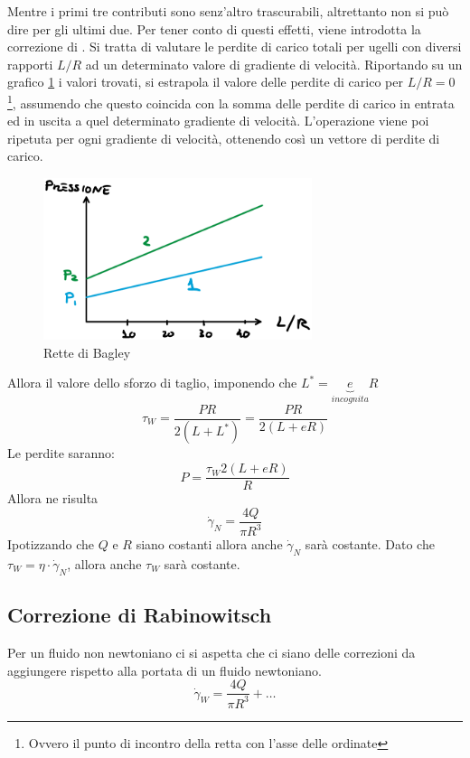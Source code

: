 Mentre i primi tre contributi sono senz'altro trascurabili, altrettanto non si può dire per gli ultimi due. Per tener conto di questi effetti, viene introdotta la correzione di .
Si tratta di valutare le perdite di carico totali per ugelli con diversi rapporti $L/R$ ad un determinato valore di gradiente di velocità.
Riportando su un grafico \ref{fig:Bagley} i valori trovati, si estrapola il valore delle perdite di carico per $L/R = 0$%
\footnote{Ovvero il punto di incontro della retta con l'asse delle ordinate},
assumendo che questo coincida con la somma delle perdite di carico in entrata ed in uscita a quel determinato gradiente di velocità.
L'operazione viene poi ripetuta per ogni gradiente di velocità, ottenendo così un vettore di perdite di carico.

\begin{figure}
\centering
\includegraphics[width = 0.7\textwidth]{gfx/Bagley}
\caption{Rette di Bagley}
\label{fig:Bagley}
\end{figure}

Allora il valore dello sforzo di taglio, imponendo che $L^* = \underbrace{e}_{incognita}R$
\begin{equation}
\tau_W = \frac{PR}{2(L + L^*)} = \frac{PR}{2(L + eR)}
\end{equation}
Le perdite saranno:
\begin{equation}
P = \frac{\tau_W 2(L + eR)}{R}
\end{equation}
Allora ne risulta
\begin{equation}
\dot{\gamma}_N = \frac{4Q}{\pi R^3}
\end{equation}
Ipotizzando  che $Q$ e $R$ siano costanti allora anche $\dot{\gamma}_N$ sarà costante.
Dato che $\tau_W = \eta \cdot \dot{\gamma}_N$, allora anche $\tau_W$ sarà costante.

\subsection{Correzione di Rabinowitsch}
Per un fluido non newtoniano ci si aspetta che ci siano delle correzioni da aggiungere rispetto alla portata di un fluido newtoniano.
\begin{equation}
\dot{\gamma}_W = \frac{4 Q}{\pi R^3} + \ldots
\end{equation}

